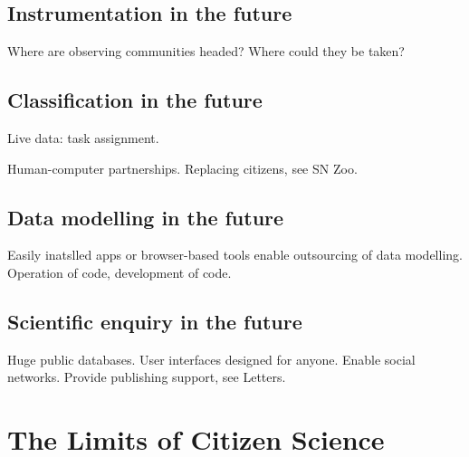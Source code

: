 \documentclass{ar2e}
\begin{document}

\subsection{Instrumentation in the future}
\label{sec:future:instr}

Where are observing communities headed? Where could they be taken?


\subsection{Classification in the future}
\label{sec:future:class}

Live data: task assignment. 

Human-computer partnerships. Replacing citizens, see SN Zoo.



\subsection{Data modelling in the future}
\label{sec:future:models}

Easily inatslled apps or browser-based tools enable outsourcing of data
modelling. Operation of code, development of code.



\subsection{Scientific enquiry in the future}
\label{sec:future:enquiry}

Huge public databases. User interfaces designed for anyone. Enable social
networks. Provide publishing support, see Letters.



\section{The Limits of Citizen Science}
\label{sec:limits}
\end{document}
